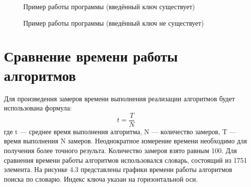 \documentclass[12pt]{report}
\begin{document}
\begin{figure}[ht!]
	\caption{Пример работы программы (введённый ключ существует)}
\end{figure}

\begin{figure}[ht!]
	\caption{Пример работы программы (введённый ключ не существует)}
\end{figure}


\newpage
\section{Сравнение времени работы алгоритмов}
Для произведения замеров времени выполнения реализации алгоритмов будет использована формула: \begin{equation}\label{eq:fourierrow}
	t = \frac{T}{N}
\end{equation}
где t — среднее время выполнения алгоритма, N — количество замеров, T — время выполнения N замеров.  
Неоднократное измерение времени необходимо для получения более точного результа.  
Количество замеров взято равным 100. Для сравнения времени работы алгоритмов использовался словарь, состоящий из 1751 элемента. На рисунке 4.3 представлены графики времени работы алгоритмов поиска по словарю. Индекс ключа указан на горизонтальной оси.
\end{document}
